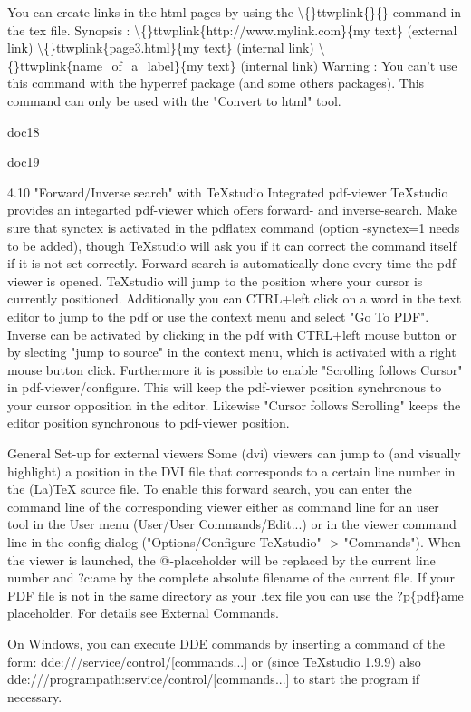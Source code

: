 \documentclass{article}
\begin{document}
	You can create links in the html pages by using the \textbackslash\{\}ttwplink\{\}\{\} command in the tex file.
	Synopsis :
	\textbackslash\{\}ttwplink\{http://www.mylink.com\}\{my text\} (external link)
	\textbackslash\{\}ttwplink\{page3.html\}\{my text\} (internal link)
	\textbackslash\{\}ttwplink\{name\_of\_a\_label\}\{my text\} (internal link)
	Warning : You can't use this command with the hyperref package (and some others packages). This command can only be used with the "Convert to html" tool.
	
	doc18
	
	doc19
	
	4.10 "Forward/Inverse search" with TeXstudio
	Integrated pdf-viewer
	TeXstudio provides an integarted pdf-viewer which offers forward- and inverse-search. Make sure that synctex is activated in the pdflatex command (option -synctex=1 needs to be added), though TeXstudio will ask you if it can correct the command itself if it is not set correctly.
	Forward search is automatically done every time the pdf-viewer is opened. TeXstudio will jump to the position where your cursor is currently positioned. Additionally you can CTRL+left click on a word in the text editor to jump to the pdf or use the context menu and select "Go To PDF".
	Inverse can be activated by clicking in the pdf with CTRL+left mouse button or by slecting "jump to source" in the context menu, which is activated with a right mouse button click. Furthermore it is possible to enable "Scrolling follows Cursor" in pdf-viewer/configure. This will keep the pdf-viewer position synchronous to your cursor opposition in the editor. Likewise "Cursor follows Scrolling" keeps the editor position synchronous to pdf-viewer position.
	
	General Set-up for external viewers
	Some (dvi) viewers can jump to (and visually highlight) a position in the DVI file that corresponds to a certain line number in the (La)TeX source file.
	To enable this forward search, you can enter the command line of the corresponding viewer either as command line for an user tool in the User menu (User/User Commands/Edit...) or in the viewer command line in the config dialog ("Options/Configure TeXstudio" -> "Commands"). When the viewer is launched, the @-placeholder will be replaced by the current line number and ?c:ame by the complete absolute filename of the current file. If your PDF file is not in the same directory as your .tex file you can use the ?p\{pdf\}ame placeholder. For details see External Commands.
	
	On Windows, you can execute DDE commands by inserting a command of the form: dde:///service/control/[commands...] or (since TeXstudio 1.9.9) also dde:///programpath:service/control/[commands...] to start the program if necessary.
	
\end{document}
